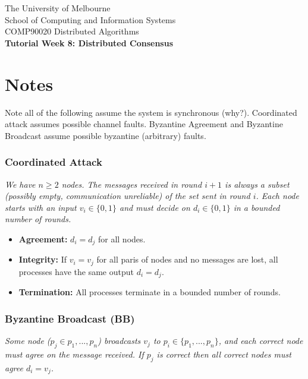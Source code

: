 \documentclass[12pt]{article}
\begin{document}
\begin{center}
    {\sc The University of Melbourne
        \\
        School of Computing and Information Systems
        \\
    COMP90020 Distributed Algorithms}
    \bigskip \\
    {\Large\bf Tutorial Week 8: Distributed Consensus}
    \bigskip \\
\end{center}

\section*{Notes}

Note all of the following assume the system is synchronous (why?). Coordinated attack assumes possible channel faults. Byzantine Agreement and Byzantine Broadcast assume possible byzantine (arbitrary) faults.

\subsubsection*{Coordinated Attack}

\begin{center}
    \textit{We have $n \geq 2$ nodes. The messages received in round $i+1$ is always a subset (possibly empty, communication unreliable) of the set sent in round $i$. Each node starts with an input $v_i \in \{0,1\}$ and must decide on $d_i \in \{0,1\}$ in a bounded number of rounds.}
\end{center}

\begin{itemize}
    \item \textbf{Agreement: } $d_i = d_j$ for all nodes.
    \item \textbf{Integrity: } If $v_i = v_j$ for all paris of nodes and no messages are lost, all processes have the same output $d_i = d_j$.
    \item \textbf{Termination: } All processes terminate in a bounded number of rounds.
\end{itemize}


\subsubsection*{Byzantine Broadcast (BB)}

\begin{center}
    \textit{Some node ($p_{j} \in {p_1, ..., p_n}$) broadcasts $v_j$ to $p_i \in \{p_1, ..., p_n\}$, and each correct node must agree on the message received. If $p_{j}$ is correct then all correct nodes must agree $d_i = v_j$.}
\end{center}
\end{document}
